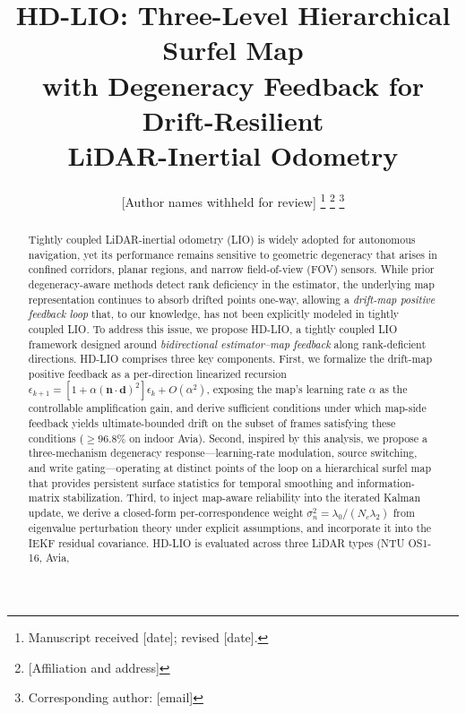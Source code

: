\documentclass[conference]{IEEEtran}
\newcommand{\bvec}[1]{\mathbf{#1}}
\begin{document}
\title{HD-LIO: Three-Level Hierarchical Surfel Map\\with Degeneracy Feedback for Drift-Resilient\\LiDAR-Inertial Odometry}

\author{[Author names withheld for review]%
\thanks{Manuscript received [date]; revised [date].}%
\thanks{[Affiliation and address]}%
\thanks{Corresponding author: [email]}%
}


\maketitle

\begin{abstract}
Tightly coupled LiDAR-inertial odometry (LIO) is widely adopted for
autonomous navigation, yet its performance remains sensitive to
geometric degeneracy that arises in confined corridors, planar regions,
and narrow field-of-view (FOV) sensors. While prior degeneracy-aware
methods detect rank deficiency in the estimator, the underlying map
representation continues to absorb drifted points one-way, allowing a
\emph{drift-map positive feedback loop} that, to our knowledge, has not
been explicitly modeled in tightly coupled LIO. To address this issue,
we propose HD-LIO, a tightly coupled LIO framework designed around
\emph{bidirectional estimator--map feedback} along rank-deficient
directions. HD-LIO comprises three key components.
First, we formalize the drift-map positive feedback as a per-direction
linearized recursion $\epsilon_{k+1} = [1 + \alpha(\bvec{n}\!\cdot\!\bvec{d})^2]\epsilon_k + O(\alpha^2)$,
exposing the map's learning rate $\alpha$ as the controllable amplification
gain, and derive sufficient conditions under which map-side feedback
yields ultimate-bounded drift on the subset of frames satisfying these
conditions ($\ge\!96.8\%$ on indoor Avia).
Second, inspired by this analysis, we propose a three-mechanism
degeneracy response—learning-rate modulation, source switching, and
write gating—operating at distinct points of the loop on a hierarchical
surfel map that provides persistent surface statistics for temporal
smoothing and information-matrix stabilization.
Third, to inject map-aware reliability into the iterated Kalman update,
we derive a closed-form per-correspondence weight $\sigma^2_n =
\lambda_0/(N_c\lambda_2)$ from eigenvalue perturbation theory under
explicit assumptions, and incorporate it into the IEKF residual
covariance.
HD-LIO is evaluated across three LiDAR types (NTU OS1-16, Avia,

\end{abstract}
\end{document}
